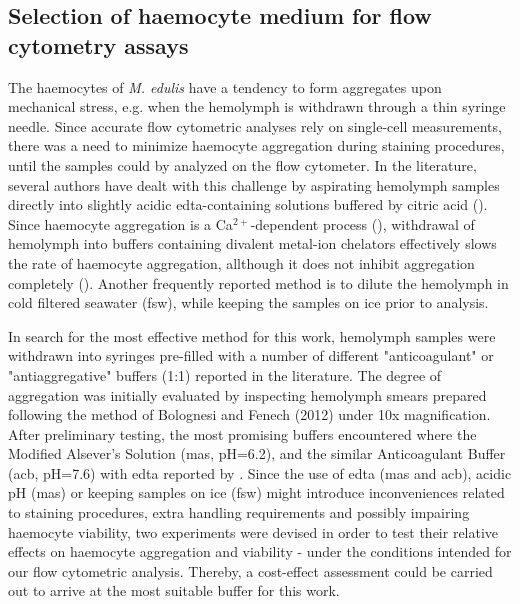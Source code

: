 \subsection{Selection of haemocyte medium for flow cytometry assays}
The haemocytes of \emph{M. edulis} have a tendency to form aggregates upon mechanical stress, e.g. when the hemolymph is withdrawn through a thin syringe needle. Since accurate flow cytometric analyses rely on single-cell measurements, there was a need to minimize haemocyte aggregation during staining procedures, until the samples could by analyzed on the flow cytometer. In the literature, several authors have dealt with this challenge by aspirating hemolymph samples directly into slightly acidic \acrshort{edta}-containing solutions buffered by citric acid (\cite{Söderhall1983, Bachere1988, LeFoll2010}). Since haemocyte aggregation is a Ca$^{2+}$-dependent process (\cite{Torreilles1999, Chen1995}), withdrawal of hemolymph into buffers containing divalent metal-ion chelators effectively slows the rate of haemocyte aggregation, allthough it does not inhibit aggregation completely (\cite{Chen1995}). Another frequently reported method is to dilute the hemolymph in cold filtered seawater (\acrshort{fsw}), while keeping the samples on ice prior to analysis. 

In search for the most effective method for this work, hemolymph samples were withdrawn into syringes pre-filled with a number of different "anticoagulant" or "antiaggregative" buffers (1:1) reported in the literature. The degree of aggregation was initially evaluated by inspecting hemolymph smears prepared following the method of Bolognesi and Fenech (2012) under 10x magnification. After preliminary testing, the most promising buffers encountered where the Modified Alsever's Solution (\acrshort{mas}, pH=6.2), and the similar Anticoagulant Buffer (\acrshort{acb}, pH=7.6) with \acrshort{edta} reported by \cite{Pipe1997}. Since the use of \acrshort{edta} (\acrshort{mas} and \acrshort{acb}), acidic pH (\acrshort{mas}) or keeping samples on ice (\acrshort{fsw}) might introduce inconveniences related to staining procedures, extra handling requirements and possibly impairing haemocyte viability, two experiments were devised in order to test their relative effects on haemocyte aggregation and viability - under the conditions intended for our flow cytometric analysis. Thereby, a cost-effect assessment could be carried out to arrive at the most suitable buffer for this work.

